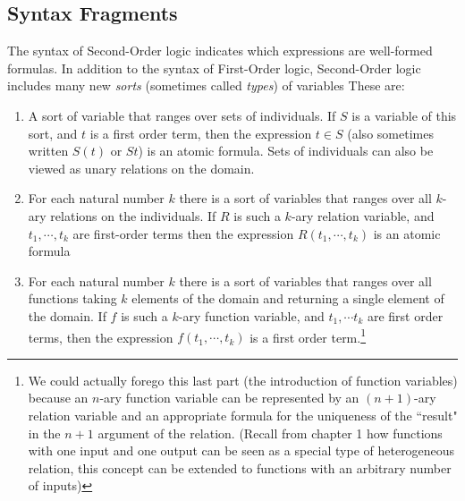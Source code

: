 \subsection{Syntax Fragments}
The syntax of Second-Order logic indicates which expressions are well-formed formulas. In addition to the syntax of First-Order logic, Second-Order logic includes many new \textit{sorts} (sometimes called \textit{types}) of variables These are:
\begin{enumerate}
    \item A sort of variable that ranges over sets of individuals. If $S$ is a variable of this sort, and $t$ is a first order term, then the expression $t\in S$ (also sometimes written $S(t)$ or $St$) is an atomic formula. Sets of individuals can also be viewed as unary relations on the domain.
    \item For each natural number $k$ there is a sort of variables that ranges over all $k$-ary relations on the individuals. If $R$ is such a $k$-ary relation variable, and $t_1, \cdots , t_k$ are first-order terms then the expression $R(t_1,\cdots , t_k)$ is an atomic formula
    \item For each natural number $k$ there is a sort of variables that ranges over all functions taking $k$ elements of the domain and returning a single element of the domain. If $f$ is such a $k$-ary function variable, and $t_1, \cdots t_k$ are first order terms, then the expression $f(t_1,\cdots ,t_k)$ is a first order term.\footnote{We could actually forego this last part (the introduction of function variables) because an $n$-ary function variable can be represented by an $(n+1)$-ary relation variable and an appropriate formula for the uniqueness of the ``result" in the $n+1$ argument of the relation. (Recall from chapter 1 how functions with one input and one output can be seen as a special type of heterogeneous relation, this concept can be extended to functions with an arbitrary number of inputs)}
\end{enumerate}





